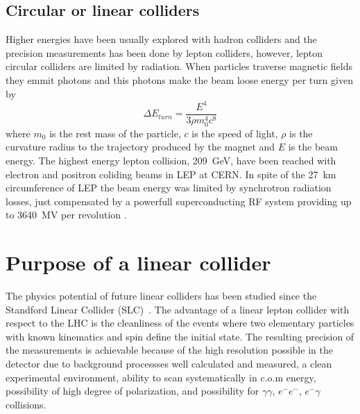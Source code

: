 \subsection{Circular or linear colliders}
Higher energies have been usually explored with hadron colliders and the precision measurements has been done by lepton colliders, however, lepton circular colliders are limited by radiation. When particles traverse magnetic fields they emmit photons and this photons make the beam loose energy per turn given by
\begin{equation}
 \Delta E_{turn}=\frac{E^4}{3\rho m_0^4c^8}
\end{equation}
where $m_0$ is the rest mass of the particle, $c$ is the speed of light, $\rho$ is the curvature radius to the trajectory produced by the magnet and $E$ is the beam energy. The highest energy lepton collision, 209~GeV, have been reached with electron and positron coliding beams in LEP at CERN.  In spite of the 27~km circumference of LEP the beam energy was limited by synchrotron radiation losses, just compensated by a powerfull superconducting RF system providing up to 3640~MV per revolution \cite{Assmann:549223}.\par
\section{Purpose of a linear collider}
The physics potential of future linear colliders has been studied since the Standford Linear Collider (SLC)~\cite{Feldman88,SLC91}. The advantage of a linear lepton collider with respect to the LHC is the cleanliness of the events where two elementary particles with known kinematics and spin define the initial state. The resulting precision of the measurements is achievable because of the high resolution possible in the detector due to background processses well calculated and measured, a clean experimental environment, ability to scan systematically in c.o.m energy, possibility of high degree of polarization, and possibility for $\gamma\gamma$, $e^-e^-$, $e^-\gamma$ collisions.\par

